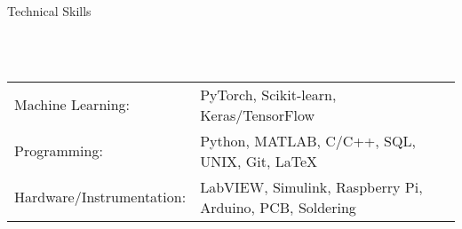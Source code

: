 \documentclass{article}
\newcommand{\lineunder} {
    \vspace*{-8pt} \\
    \hspace*{-18pt} \hrulefill \\
}
\newcommand{\header} [1] {
    {\hspace*{-18pt}\vspace*{6pt} \Large{#1} }
    \vspace*{-6pt} 
    \lineunder
}
\begin{document}


%
\vspace{5mm}

\header{Technical Skills}
\vspace{1mm}
\begin{tabular}{ l l }
        Machine Learning: & PyTorch, Scikit-learn, Keras/TensorFlow \\
        Programming: & Python, MATLAB, C/C++, SQL, UNIX, Git, \LaTeX \\ 
        Hardware/Instrumentation: & LabVIEW, Simulink, Raspberry Pi, Arduino, PCB, Soldering
\end{tabular}
\vspace{5mm}
\end{document}
